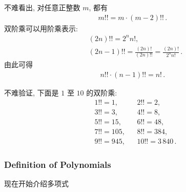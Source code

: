 \begin{remark}
    不难看出, 对任意正整数 $m$, 都有
    \begin{align*}
        m!! = m \cdot (m-2)!! \period
    \end{align*}
    双阶乘可以用阶乘表示:
    \begin{align*}
         & (2n)!! = 2^n n!,                                               \\
         & (2n-1)!! = \frac{(2n)!}{(2n)!!} = \frac{(2n)!}{2^n n!} \period
    \end{align*}
    由此可得
    \begin{align*}
        n!! \cdot (n-1)!! = n! \period
    \end{align*}
\end{remark}

\begin{example}
    不难验证, 下面是 $1$ 至 $10$ 的双阶乘:
    \begin{align*}
         & 1!! = 1,   &  & 2!! = 2,              \\
         & 3!! = 3,   &  & 4!! = 8,              \\
         & 5!! = 15,  &  & 6!! = 48,             \\
         & 7!! = 105, &  & 8!! = 384,            \\
         & 9!! = 945, &  & 10!! = 3\,840 \period
    \end{align*}
\end{example}

\subsubsection*{Definition of Polynomials}

现在开始介绍多项式\period
